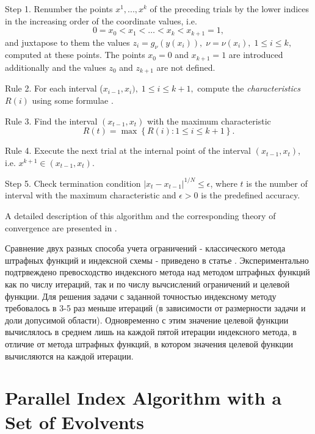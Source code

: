 \documentclass[smallextended]{svjour3}       %
\begin{document}
Step 1. Renumber the points $x^1,...,x^k$ of the preceding trials by the lower indices in the increasing order of the coordinate values, i.e.
\[
0=x_0<x_1<\dots <x_k<x_{k+1}=1,
\]
and juxtapose to them the values $z_i=g_\nu(y(x_i)), \; \nu=\nu(x_i), \; 1 \leq i \leq k,$ computed at these points. The points $x_0=0$ and $x_{k+1}=1$ are introduced additionally and the values $z_0$ and $z_{k+1}$ are not defined.

Rule 2. For each interval ($x_{i-1},x_i), \; 1 \leq i \leq k+1,$ compute the \textit{characteristics} $R(i)$ using some formulae \cite{Barkalov2002}.

Rule 3. Find the interval $(x_{t-1},x_t)$ with the maximum characteristic
\begin{equation}\label{MaxR}
R(t)=\max{\left\{R(i): 1 \leq i \leq k+1\right\}}.
\end{equation}

Rule 4. Execute the next trial at the internal point of the interval $(x_{t-1},x_t)$, i.e. $x^{k+1} \in (x_{t-1},x_t)$.

Step 5. Check termination condition $\left|x_t-x_{t-1}\right|^{1/N}\leq \epsilon$, where $t$ is the number of interval with the maximum characteristic and $\epsilon > 0$ is the predefined accuracy.

A detailed description of this algorithm and the corresponding theory of convergence are presented in \cite{Strongin2000,Sergeyev2001,Barkalov2002}.

\Russian
Сравнение двух разных способа учета ограничений - классического метода штрафных функций и индексной схемы - приведено в статье \cite{Barkalov2017}. Экспериментально подтрвеждено превосходство индексного метода над методом штрафных функций как по числу итераций, так и по числу вычсислений ограничений и целевой функции. Для решения задачи с заданной точностью индексному методу требовалось в 3-5 раз меньше итераций (в зависимости от размерности задачи и доли допусимой области). Одновременно с этим значение целевой функции вычислялось в среднем лишь на каждой пятой итерации индексного метода, в отличие от метода штрафных функций, в котором значения целевой функции вычисляются на каждой итерации.


\section{Parallel Index Algorithm with a Set of Evolvents}
\label{sec:3}
\end{document}
